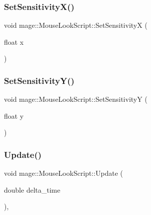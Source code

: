\hypertarget{classmage_1_1_mouse_look_script_a3acf0b2991234849fbf9256bb4fe48d4}{}\label{classmage_1_1_mouse_look_script_a3acf0b2991234849fbf9256bb4fe48d4} 
\subsubsection{\texorpdfstring{Set\+Sensitivity\+X()}{SetSensitivityX()}}
{\footnotesize\ttfamily void mage\+::\+Mouse\+Look\+Script\+::\+Set\+SensitivityX (\begin{DoxyParamCaption}\item[{float}]{x }\end{DoxyParamCaption})\hspace{0.3cm}{\ttfamily [noexcept]}}

\hypertarget{classmage_1_1_mouse_look_script_a3b92c0fd89b2fe82c7c688705ef24ee4}{}\label{classmage_1_1_mouse_look_script_a3b92c0fd89b2fe82c7c688705ef24ee4} 
\subsubsection{\texorpdfstring{Set\+Sensitivity\+Y()}{SetSensitivityY()}}
{\footnotesize\ttfamily void mage\+::\+Mouse\+Look\+Script\+::\+Set\+SensitivityY (\begin{DoxyParamCaption}\item[{float}]{y }\end{DoxyParamCaption})\hspace{0.3cm}{\ttfamily [noexcept]}}

\hypertarget{classmage_1_1_mouse_look_script_a7962403a78c02b2fe64e8f06f6319312}{}\label{classmage_1_1_mouse_look_script_a7962403a78c02b2fe64e8f06f6319312} 
\subsubsection{\texorpdfstring{Update()}{Update()}}
{\footnotesize\ttfamily void mage\+::\+Mouse\+Look\+Script\+::\+Update (\begin{DoxyParamCaption}\item[{double}]{delta\+\_\+time }\end{DoxyParamCaption})\hspace{0.3cm}{\ttfamily [override]}, {\ttfamily [virtual]}}

